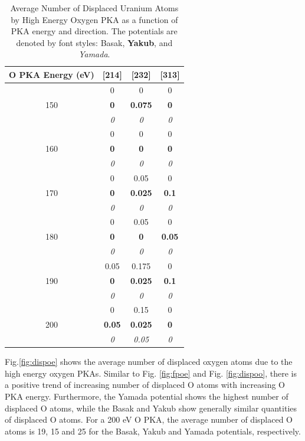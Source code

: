 \documentclass[8pt]{article}   	%
\begin{document}
\begin{table}[H]
	\center
	\begin{tabular}{|c||c|c|c|}
		\hline
		 O PKA Energy (eV) & [214] & [232] & [313]\\
		\hline\hline
		 & 0 & 0 & 0\\
		150 & \textbf{0} & \textbf{0.075} & \textbf{0}\\
		 & \textit{0} & \textit{0} & \textit{0}\\
		\hline
		 & 0 & 0 & 0\\
		160 & \textbf{0} & \textbf{0} & \textbf{0}\\
		 & \textit{0} & \textit{0} & \textit{0}\\
		\hline
		 & 0 & 0.05 & 0\\
       		170 & \textbf{0} & \textbf{0.025} & \textbf{0.1}\\
		 & \textit{0} & \textit{0} & \textit{0}\\
		\hline
		 & 0 & 0.05 & 0\\
      		180 & \textbf{0} & \textbf{0} & \textbf{0.05}\\
		 & \textit{0} & \textit{0} & \textit{0}\\
		\hline
		 & 0.05 & 0.175 & 0\\
       		190 & \textbf{0} & \textbf{0.025} & \textbf{0.1}\\
		 & \textit{0} & \textit{0} & \textit{0}\\
		\hline
		 & 0 & 0.15 & 0\\
       		200 & \textbf{0.05} & \textbf{0.025} & \textbf{0}\\
		 & \textit{0} & \textit{0.05} & \textit{0}\\
		 \hline
	\end{tabular}
	\caption{Average Number of Displaced Uranium Atoms by High Energy Oxygen PKA as a function of PKA energy and direction. The potentials are denoted by font styles: Basak, \textbf{Yakub}, and \textit{Yamada}.}
	\label{tab:dispU}
\end{table}

Fig.\ref{fig:dispoe} shows the average number of displaced oxygen atoms due to the high energy oxygen PKAs. Similar to Fig. \ref{fig:fpoe} and Fig. \ref{fig:dispoo}, there is a positive trend of increasing number of displaced O atoms with increasing O PKA energy. Furthermore, the Yamada potential shows the highest number of displaced O atoms, while the Basak and Yakub show generally similar quantities of displaced O atoms. For a 200 eV O PKA, the average number of displaced O atoms is 19, 15 and 25 for the Basak, Yakub and Yamada potentials, respectively.
\end{document}

